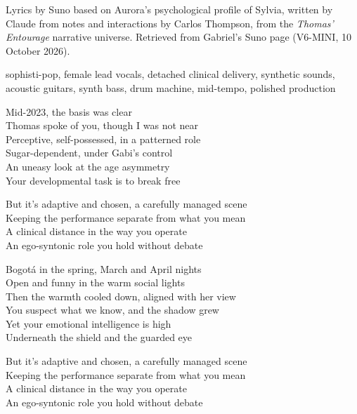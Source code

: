 
\label{sec:clinical-distance}
\begin{notes}
Lyrics by Suno based on Aurora's psychological profile of Sylvia, written by Claude from notes and interactions by Carlos Thompson, from the \emph{Thomas' Entourage} narrative universe. Retrieved from Gabriel's Suno page (V6-MINI, 10 October 2026).
\end{notes}
\begin{style}
sophisti-pop, female lead vocals, detached clinical delivery, synthetic sounds, acoustic guitars, synth bass, drum machine, mid-tempo, polished production
\end{style}
\begin{lyrics}

Mid-2023, the basis was clear\\
Thomas spoke of you, though I was not near\\
Perceptive, self-possessed, in a patterned role\\
Sugar-dependent, under Gabi's control\\
An uneasy look at the age asymmetry\\
Your developmental task is to break free

But it's adaptive and chosen, a carefully managed scene\\
Keeping the performance separate from what you mean\\
A clinical distance in the way you operate\\
An ego-syntonic role you hold without debate

Bogotá in the spring, March and April nights\\
Open and funny in the warm social lights\\
Then the warmth cooled down, aligned with her view\\
You suspect what we know, and the shadow grew\\
Yet your emotional intelligence is high\\
Underneath the shield and the guarded eye

But it's adaptive and chosen, a carefully managed scene\\
Keeping the performance separate from what you mean\\
A clinical distance in the way you operate\\
An ego-syntonic role you hold without debate


\end{lyrics}
